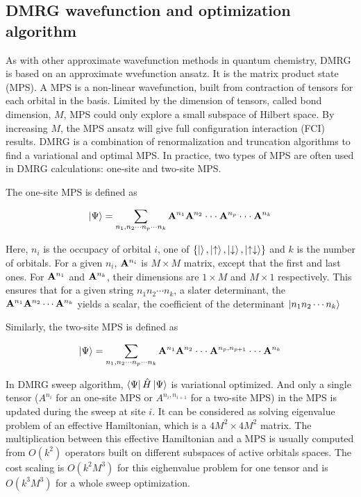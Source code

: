 
\subsection{DMRG wavefunction and optimization algorithm}

As with other approximate wavefunction methods in quantum chemistry, DMRG is based on an approximate wvefunction ansatz. It is the matrix product state (MPS).
A MPS is a non-linear wavefunction, built from contraction of tensors for each orbital in the basis. Limited by the dimension of tensors, called bond dimension, $M$, MPS could only explore a small subspace of Hilbert space. By increasing $M$, the MPS ansatz will give full configuration interaction (FCI) results. DMRG is a combination of renormalization and truncation algorithms to find a variational and optimal MPS. 
In practice, two types of MPS are often used in DMRG calculations: one-site and two-site MPS. 

The one-site MPS is defined as

\begin{equation}
  \ket{\Psi}= \sum_{\substack{n_1, n_2\cdot\cdot\cdot n_p\cdot\cdot\cdot n_k}} {\bf A}^{n_1}{\bf A}^{n_2}\cdot\cdot\cdot {\bf A}^{n_{p}} \cdot\cdot\cdot{\bf A}^{n_k}
\end{equation}

Here, $n_i$ is the occupacy of orbital $i$, one of $ \{\ket{}, \ket{\uparrow}, \ket{\downarrow}, \ket{\uparrow\downarrow}\}$ and $k$ is the number of orbitals. 
For a given $n_i$, ${\bf A}^{n_i}$ is $M\times M$ matrix, except that the first and last ones. For ${\bf A}^{n_1}$ and ${\bf A}^{n_k}$, their dimensions are $1\times M$ and $M\times 1$ respectively. 
This ensures that for a given string $n_1n_2\cdots n_k$, a slater determinant, the ${\bf A}^{n_1}{\bf A}^{n_2}\cdots{\bf A}^{n_k}$ yields a scalar, the coefficient of the determinant $\ket{n_1n_2\cdots n_k}$

Similarly, the two-site MPS is defined as

\begin{equation}
  \ket{\Psi}= \sum_{\substack{n_1, n_2\cdot\cdot\cdot n_p\cdot\cdot\cdot n_k}} {\bf A}^{n_1}{\bf A}^{n_2}\cdot\cdot\cdot {\bf A}^{n_{p},n_{p+1}} \cdot\cdot\cdot{\bf A}^{n_k}
\end{equation}

In DMRG sweep algorithm, $\bra{\Psi}\hat{H}\ket{\Psi}$ is variational optimized. And only a single tensor ($A^{n_i}$ for an one-site MPS or $A^{n_i, n_{i+1}}$ for a two-site MPS) in the MPS is updated during the sweep at site $i$. It can be considered as solving eigenvalue problem of an effective Hamiltonian, which is a $4M^2\times 4M^2$ matrix. 
The multiplication between this effective Hamiltonian and a MPS is usually computed from $O(k^2)$ operators built on different subspaces of active orbitals spaces. The cost scaling is $O(k^2M^3)$ for this eighenvalue problem for one tensor and is $O(k^3M^3)$ for a whole sweep optimization. 


